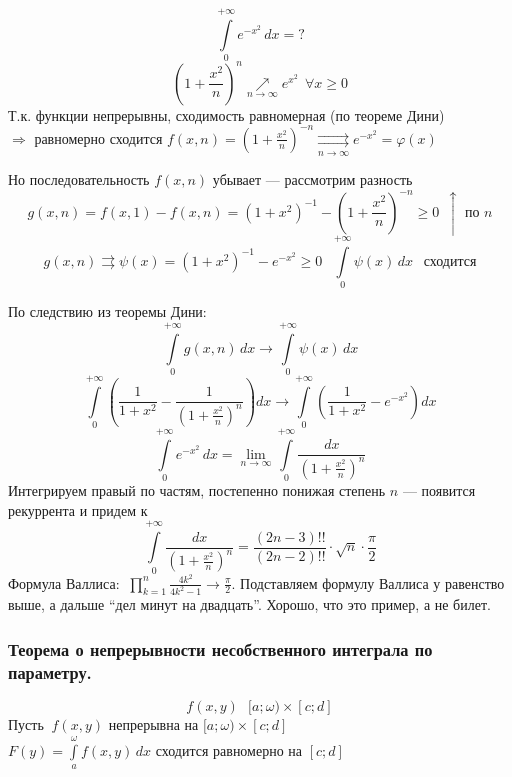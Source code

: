 \begin{example}
    \[ \int\limits_0^{+\infty} e^{-x^2}\,dx = ? \]
    \[ \left( 1 + \frac{x^2}{n} \right)^n \underset{n \to \infty}{\nearrow} e^{x^2} \ \ \forall x \ge 0 \]
    Т.к. функции непрерывны, сходимость равномерная (по теореме Дини) \\
    $\Rightarrow$ равномерно сходится $f(x, n) = \left( 1 + \frac{x^2}{n} \right)^{-n} 
    \underset{n \to \infty}{\rightrightarrows} e^{-x^2} = \varphi(x)$
    
    Но последовательность $f(x, n)$ убывает --- рассмотрим разность
    \[ g(x, n) = f(x, 1) - f(x, n) = \left( 1 + x^2 \right)^{-1} - \left( 1 + \frac{x^2}{n} \right)^{-n} \ge 0 \ \ 
    \uparrow \text{ по } n \]
    \[ g(x, n) \rightrightarrows \psi(x) = (1  +x^2)^{-1} - e^{-x^2} \ge 0 \ \ \ \int\limits_0^{+\infty} \psi(x)\,dx \ \ 
    \text{ сходится} \]
    
    По следствию из теоремы Дини:
    \[\int\limits_0^{+\infty} g(x, n)\,dx \to \int\limits_0^{+\infty} \psi(x)\,dx \]
    \[ \int\limits_0^{+\infty} \left( \frac1{1 + x^2} - \frac1{\left( 1 + \frac{x^2}n \right)^n} \right) dx \to
    \int\limits_0^{+\infty} \left( \frac1{1 + x^2} - e^{-x^2} \right) dx \]
    \[ \int\limits_0^{+\infty} e^{-x^2}\,dx = 
    \lim_{n \to \infty} \int\limits_0^{+\infty} \frac{dx}{\left( 1 + \frac{x^2}n \right)^n} \] 
    Интегрируем правый по частям, постепенно понижая степень $n$ — появится рекуррента и придем к
    \[ \int\limits_0^{+\infty} \frac{dx}{\left( 1 + \frac{x^2}n \right)^n} = 
    \frac{(2n - 3)!!}{(2n - 2)!!} \cdot \sqrt{n} \cdot \frac{\pi}2 \]
    Формула Валлиса: $\ \prod\limits_{k = 1}^n \frac{4k^2}{4k^2 - 1} \to \frac{\pi}2$. Подставляем 
    формулу Валлиса у равенство выше, а дальше ``дел минут на двадцать''. Хорошо, что это пример, а не билет.
\end{example}

\subsubsection{Теорема о непрерывности несобственного интеграла по параметру.}
\[ f(x, y) \ \ \ [a; \omega) \times [c; d] \]
Пусть $\ f(x, y)$ непрерывна на $[a; \omega) \times [c; d]$ \\
\phantom{Пусть} $F(y) = \int\limits_a^{\omega} f(x, y)\,dx$ сходится равномерно на $[c; d]$

